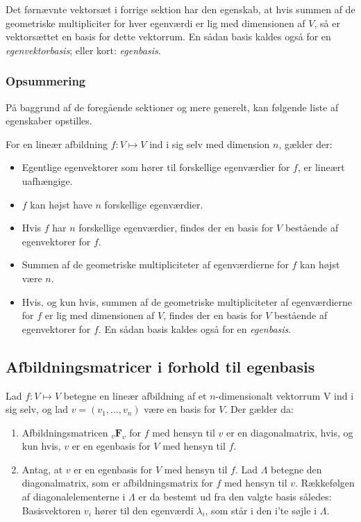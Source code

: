 \documentclass{article}
\newcommand{\afb}[3]{\ensuremath{_#1 \textbf{#2}_#3}}
\begin{document}
	Det førnævnte vektorsæt i forrige sektion har den egenskab, at hvis summen af de geometriske multipliciter for hver egenværdi er lig med dimensionen af $V$, så er vektorsættet en basis for dette vektorrum. En sådan basis kaldes også for en \textit{egenvektorbasis}; eller kort: \textit{egenbasis}.
	
	\subsubsection{Opsummering}
	På baggrund af de foregående sektioner og mere generelt, kan følgende liste af egenskaber opstilles.\newline
	
	For en lineær afbildning $f : V \mapsto V$ ind i sig selv med dimension $n$, gælder der:
	\begin{itemize}
		\item Egentlige egenvektorer som hører til forskellige egenværdier for $f$, er lineært uafhængige.
		\item $f$ kan højst have $n$ forskellige egenværdier.
		\item Hvis $f$ har $n$ forskellige egenværdier, findes der en basis for $V$ bestående af egenvektorer for $f$.
		\item Summen af de geometriske multipliciteter af egenværdierne for $f$ kan højst være $n$.
		\item 	Hvis, og kun hvis, summen af de geometriske multipliciteter af egenværdierne for $f$ er lig med dimensionen af $V$, findes der en basis for $V$ bestående af egenvektorer for $f$. En sådan basis kaldes også for en \textit{egenbasis}.
	\end{itemize}
	\subsection{Afbildningsmatricer i forhold til egenbasis}
	
	Lad $ f : V \mapsto V $ betegne en lineær afbildning af et $n$-dimensionalt vektorrum V ind i sig selv, og lad $ v=(v_1,…,v_n)$ være en basis for $V$. Der gælder da:
	
	\begin{enumerate}
		\item Afbildningsmatricen $\afb{v}{F}{v}$ for $f$ med hensyn til $v$ er en diagonalmatrix, hvis, og kun hvis, $v$ er en egenbasis for $V$ med hensyn til $f$.
		\item Antag, at $v$ er en egenbasis for $V$ med hensyn til $f$. Lad $\Lambda$ betegne den diagonalmatrix, som er afbildningsmatrix for $f$ med hensyn til $v$. Rækkefølgen af diagonalelementerne i $\Lambda$ er da bestemt ud fra den valgte basis således: Basisvektoren $v_i$ hører til den egenværdi $\lambda_i$, som står i den i’te søjle i $\Lambda$.
	\end{enumerate}
	
\end{document}
